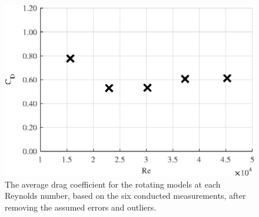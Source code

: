 \begin{figure}[h!]
    \centering
    \includegraphics[width=0.8\linewidth]{0_Images/RotationalAverageRe.eps}
    \caption[Avergare drag coefficient for the rotating models.]{The average drag coefficient for the rotating models at each Reynolds number, based on the six conducted measurements, after removing the assumed errors and outliers.}
    \label{fig:RotationalAvg}
\end{figure}



\FloatBarrier